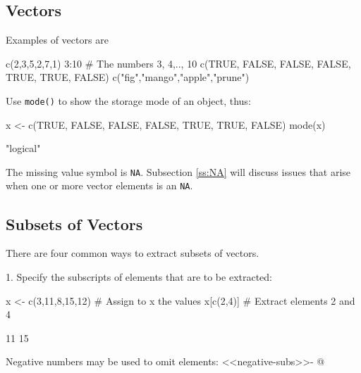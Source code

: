 \documentclass{tufte-book}\usepackage[]{graphicx}\usepackage[]{color}
\newcommand{\txtt}[1]{\texttt{#1}}
\begin{document}
\subsection{Vectors}\label{ss:vector}
Examples of vectors  are
\begin{Schunk}
\begin{Sinput}
c(2,3,5,2,7,1)
3:10 # The numbers 3, 4,.., 10
c(TRUE, FALSE, FALSE, FALSE, TRUE, TRUE, FALSE)
c("fig","mango","apple","prune")
\end{Sinput}
\end{Schunk}

Use \txtt{mode()} to show the storage mode of an object, thus:
\begin{Schunk}
\begin{Sinput}
x <- c(TRUE, FALSE, FALSE, FALSE, TRUE, TRUE, FALSE)
mode(x)
\end{Sinput}
\begin{Soutput}
[1] "logical"
\end{Soutput}
\end{Schunk}

The missing value symbol is \txtt{NA}.  Subsection \ref{ss:NA} will
discuss issues that arise when one or more vector elements is an \txtt{NA}.

\subsection*{Subsets of Vectors}
There are four common ways to extract subsets of vectors.

1. Specify the subscripts of elements that are to be extracted:
\begin{Schunk}
\begin{Sinput}
x <- c(3,11,8,15,12)   # Assign to x the values
x[c(2,4)]              # Extract elements 2 and 4
\end{Sinput}
\begin{Soutput}
[1] 11 15
\end{Soutput}
\end{Schunk}
\noindent
Negative numbers may be used to omit elements:
<<negative-subs>>-
@
\end{document}
